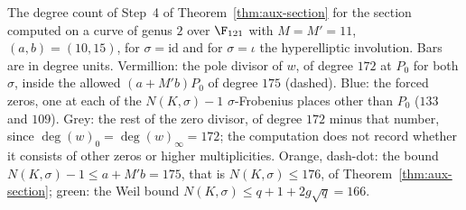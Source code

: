 \caption{The degree count of Step~4 of Theorem~\ref{thm:aux-section} for
the section computed on a curve of genus $2$ over $\F_{121}$ with
$M=M'=11$, $(a,b)=(10,15)$, for
$\sigma=\mathrm{id}$ and for $\sigma=\iota$ the hyperelliptic involution.
Bars are in degree units. Vermillion: the pole divisor of $w$, of degree
$172$ at $P_0$ for both $\sigma$, inside the allowed $(a+M'b)P_0$ of degree
$175$ (dashed). Blue: the forced zeros, one at each of the $N(K,\sigma)-1$
$\sigma$-Frobenius places other than $P_0$ ($133$ and $109$). Grey: the rest
of the zero divisor, of degree $172$ minus that number, since
$\deg(w)_0=\deg(w)_\infty=172$; the computation does not record whether it
consists of other zeros or higher multiplicities. Orange, dash-dot: the
bound $N(K,\sigma)-1\le a+M'b=175$, that is $N(K,\sigma)\le176$, of
Theorem~\ref{thm:aux-section}; green: the Weil bound
$N(K,\sigma)\le q+1+2g\sqrt q=166$.}
\label{fig:zero-pole-budget}
